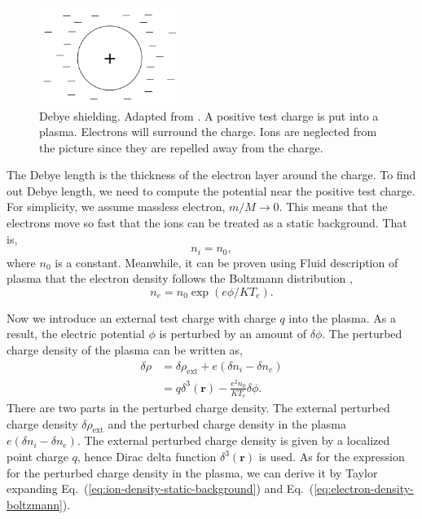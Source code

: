 \begin{figure}[htbp]
	\centering
	\includegraphics[width=0.4\textwidth]{figures/debye-shielding.png}
	\caption{Debye shielding. Adapted from \cite{chen_introduction_2016}. A positive test charge is put into a plasma. Electrons will surround the charge. Ions are neglected from the picture since they are repelled away from the charge.}
	\label{fig:debye-shielding}
\end{figure}

The Debye length is the thickness of the electron layer around the charge. To find out Debye length, we need to compute the potential near the positive test charge. For simplicity, we assume massless electron, $m/M \to 0$. This means that the electrons move so fast that the ions can be treated as a static background. That is,
\begin{equation}
	n_i = n_0,
	\label{eq:ion-density-static-background}
\end{equation}
where $n_0$ is a constant. Meanwhile, it can be proven using Fluid description of plasma that the electron density follows the Boltzmann distribution \cite{chen_introduction_2016},
\begin{equation}
	n_e = n_0\exp(e\phi/KT_e).
	\label{eq:electron-density-boltzmann}
\end{equation}

Now we introduce an external test charge with charge $q$ into the plasma. As a result, the electric potential $\phi$ is perturbed by an amount of $\delta\phi$. The perturbed charge density of the plasma can be written as,
\begin{equation}
	\begin{aligned}
		\delta\rho & = \delta\rho_{\text{ext}} + e(\delta n_i - \delta n_e)   \\
		           & = q\delta^3(\mathbf{r}) - \frac{e^2n_0}{KT_e}\delta\phi.
	\end{aligned}
\end{equation}
There are two parts in the perturbed charge density. The external perturbed charge density $\delta\rho_{\text{ext}}$ and the perturbed charge density in the plasma $e(\delta n_i - \delta n_e)$. The external perturbed charge density is given by a localized point charge $q$, hence Dirac delta function $\delta^3(\mathbf{r})$ is used. As for the expression for the perturbed charge density in the plasma, we can derive it by Taylor expanding Eq.~(\ref{eq:ion-density-static-background}) and Eq.~(\ref{eq:electron-density-boltzmann}).

